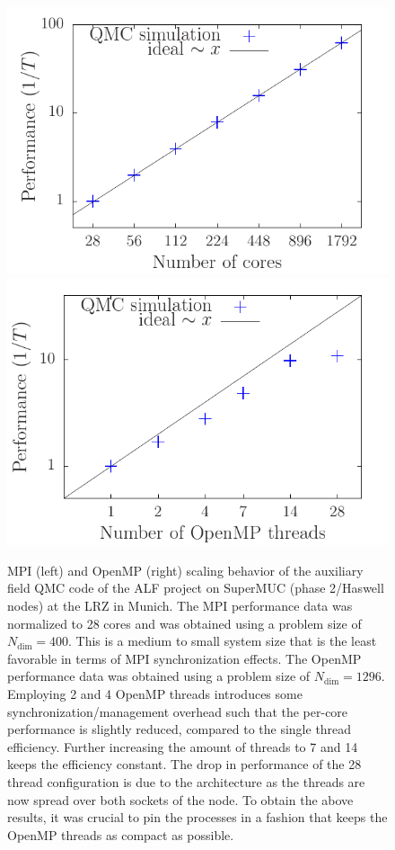 \begin{figure}[H]
	\begin{center}
		\includegraphics[scale=0.6]{Figures/MPI_scaling_ALF_2.pdf}
		\includegraphics[scale=0.6]{Figures/OMP_scaling_ALF_2.pdf}
	\end{center}
	\caption{\label{fig_scaling} MPI (left) and OpenMP (right) scaling behavior of the auxiliary field QMC code of the ALF project on SuperMUC (phase 2/Haswell nodes) at the LRZ in Munich.
		The MPI performance data was normalized to 28 cores and was obtained using a problem size of $N_{\text{dim}}=400$. This is a medium to small system size that is the least favorable in terms of MPI synchronization effects.
		The OpenMP performance data was obtained using a problem size of $N_{\text{dim}}=1296$. Employing 2 and 4 OpenMP threads introduces some synchronization/management overhead such that the per-core performance is slightly reduced, compared to the single thread efficiency. Further increasing the amount of threads to 7 and 14 keeps the efficiency constant. The drop in performance of the 28 thread configuration is due to the architecture as the threads are now spread over both sockets of the node. To obtain the above results, it was crucial to pin the processes in a fashion that keeps the OpenMP threads as compact as possible.}
\end{figure}

